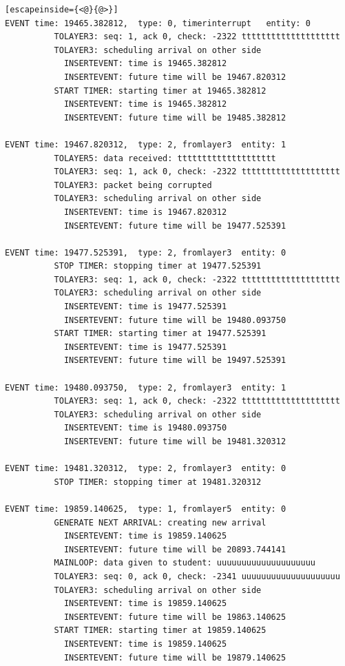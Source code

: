 \documentclass[paper=a4, fontsize=11pt]{scrartcl}
\numberwithin{equation}{section}		%
\numberwithin{figure}{section}			%
\numberwithin{table}{section}				%
\begin{document}
\begin{lstlisting}[escapeinside={<@}{@>}]
EVENT time: 19465.382812,  type: 0, timerinterrupt   entity: 0
          TOLAYER3: seq: 1, ack 0, check: -2322 tttttttttttttttttttt
          TOLAYER3: scheduling arrival on other side
            INSERTEVENT: time is 19465.382812
            INSERTEVENT: future time will be 19467.820312
          START TIMER: starting timer at 19465.382812
            INSERTEVENT: time is 19465.382812
            INSERTEVENT: future time will be 19485.382812

EVENT time: 19467.820312,  type: 2, fromlayer3  entity: 1
          TOLAYER5: data received: tttttttttttttttttttt
          TOLAYER3: seq: 1, ack 0, check: -2322 tttttttttttttttttttt
          TOLAYER3: packet being corrupted
          TOLAYER3: scheduling arrival on other side
            INSERTEVENT: time is 19467.820312
            INSERTEVENT: future time will be 19477.525391

EVENT time: 19477.525391,  type: 2, fromlayer3  entity: 0
          STOP TIMER: stopping timer at 19477.525391
          TOLAYER3: seq: 1, ack 0, check: -2322 tttttttttttttttttttt
          TOLAYER3: scheduling arrival on other side
            INSERTEVENT: time is 19477.525391
            INSERTEVENT: future time will be 19480.093750
          START TIMER: starting timer at 19477.525391
            INSERTEVENT: time is 19477.525391
            INSERTEVENT: future time will be 19497.525391

EVENT time: 19480.093750,  type: 2, fromlayer3  entity: 1
          TOLAYER3: seq: 1, ack 0, check: -2322 tttttttttttttttttttt
          TOLAYER3: scheduling arrival on other side
            INSERTEVENT: time is 19480.093750
            INSERTEVENT: future time will be 19481.320312

EVENT time: 19481.320312,  type: 2, fromlayer3  entity: 0
          STOP TIMER: stopping timer at 19481.320312

EVENT time: 19859.140625,  type: 1, fromlayer5  entity: 0
          GENERATE NEXT ARRIVAL: creating new arrival
            INSERTEVENT: time is 19859.140625
            INSERTEVENT: future time will be 20893.744141
          MAINLOOP: data given to student: uuuuuuuuuuuuuuuuuuuu
          TOLAYER3: seq: 0, ack 0, check: -2341 uuuuuuuuuuuuuuuuuuuu
          TOLAYER3: scheduling arrival on other side
            INSERTEVENT: time is 19859.140625
            INSERTEVENT: future time will be 19863.140625
          START TIMER: starting timer at 19859.140625
            INSERTEVENT: time is 19859.140625
            INSERTEVENT: future time will be 19879.140625


\end{lstlisting}
\end{document}
